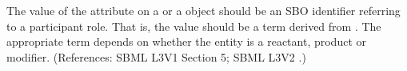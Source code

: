 The value of the attribute  on a \SpeciesReference or a
\ModifierSpeciesReference object should be an SBO identifier referring to a
participant role.  That is, the value should be a term derived from
\sboparticipantrole.  The appropriate term depends on whether the entity is
a reactant, product or modifier.  (References: SBML L3V1 Section 5; SBML L3V2
.)
